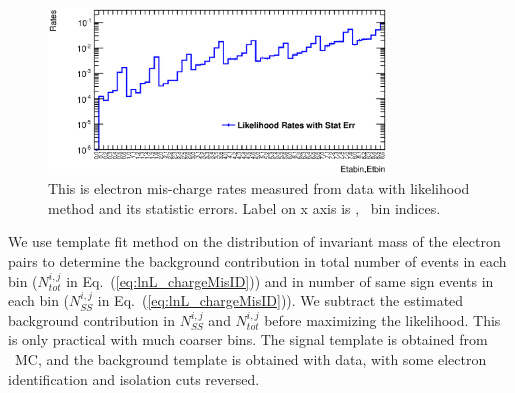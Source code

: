 
\begin{figure}[htp]
\centering
\includegraphics[width=0.8\textwidth]{figures/ChargeMisID/Egamma_LL.eps}
\caption{This is electron mis-charge rates measured from data with likelihood method and its statistic errors. Label on x axis is \eta, \pt\ bin indices.}
\label{fig:LL_Rates_Egamma}
\end{figure}

We use template fit method on the distribution of invariant mass of
the electron pairs to determine the background contribution in total
number of events in each bin ($N^{i,j}_{tot}$ in
Eq.~(\ref{eq:lnL_chargeMisID})) and in number of same sign events in each
bin ($N^{i,j}_{SS}$ in Eq.~(\ref{eq:lnL_chargeMisID})).  We subtract the
estimated background contribution in $N^{i,j}_{SS}$ and
$N^{i,j}_{tot}$ before maximizing the likelihood. This is only
practical with much coarser bins. The signal template is obtained from
\Zee\ MC, and the background template is obtained with data, with some
electron identification and isolation cuts reversed.

